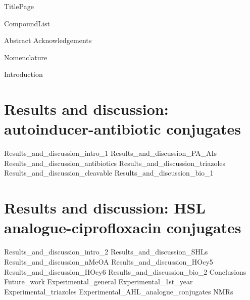 \documentclass[10pt,a4paper]{article}
\begin{document}
{TitlePage}

{CompoundList}

\tableofcontents

{Abstract}
{Acknowledgements}

\newpage
{Nomenclature}
\printnomenclature

\newpage
{Introduction}

\newpage
\section{Results and discussion: autoinducer-antibiotic conjugates\label{sec:AACs}}
{Results_and_discussion_intro_1}
{Results_and_discussion_PA_AIs}
{Results_and_discussion_antibiotics}
{Results_and_discussion_triazoles}
{Results_and_discussion_cleavable}
{Results_and_discussion_bio_1}

\newpage
\section{Results and discussion: HSL analogue-ciprofloxacin conjugates\label{sec:HSLCipCs}}
{Results_and_discussion_intro_2}
{Results_and_discussion_SHLs}
{Results_and_discussion_nMeOA}
{Results_and_discussion_HOcy5}
{Results_and_discussion_HOcy6}
{Results_and_discussion_bio_2}
\newpage
{Conclusions}
\newpage
{Future_work}
\newpage
{Experimental_general}
{Experimental_1st_year}
{Experimental_triazoles}
{Experimental_AHL_analogue_conjugates}
{NMRs}


\newpage
{}


\listoftodos
\end{document}
